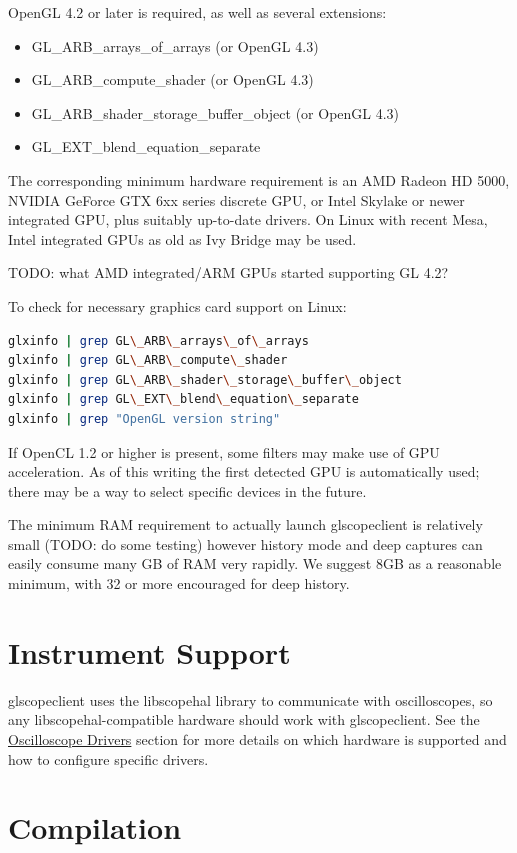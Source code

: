 OpenGL 4.2 or later is required, as well as several extensions:
\begin{itemize}
\item GL\_ARB\_arrays\_of\_arrays (or OpenGL 4.3)
\item GL\_ARB\_compute\_shader (or OpenGL 4.3)
\item GL\_ARB\_shader\_storage\_buffer\_object (or OpenGL 4.3)
\item GL\_EXT\_blend\_equation\_separate
\end{itemize}

The corresponding minimum hardware requirement is an AMD Radeon HD 5000, NVIDIA GeForce GTX 6xx series discrete GPU, or
Intel Skylake or newer integrated GPU, plus suitably up-to-date drivers. On Linux with recent Mesa, Intel integrated
GPUs as old as Ivy Bridge may be used.

TODO: what AMD integrated/ARM GPUs started supporting GL 4.2?

To check for necessary graphics card support on Linux:
\begin{lstlisting}[language=sh]
glxinfo | grep GL\_ARB\_arrays\_of\_arrays
glxinfo | grep GL\_ARB\_compute\_shader
glxinfo | grep GL\_ARB\_shader\_storage\_buffer\_object
glxinfo | grep GL\_EXT\_blend\_equation\_separate
glxinfo | grep "OpenGL version string"
\end{lstlisting}

If OpenCL 1.2 or higher is present, some filters may make use of GPU acceleration. As of this writing the first
detected GPU is automatically used; there may be a way to select specific devices in the future.

The minimum RAM requirement to actually launch glscopeclient is relatively small (TODO: do some testing) however
history mode and deep captures can easily consume many GB of RAM very rapidly. We suggest 8GB as a reasonable minimum,
with 32 or more encouraged for deep history.

\section{Instrument Support}

glscopeclient uses the libscopehal library to communicate with oscilloscopes, so any libscopehal-compatible hardware
should work with glscopeclient. See the \hyperref[sec:drivers]{Oscilloscope Drivers} section for more details on which
hardware is supported and how to configure specific drivers.

\section{Compilation}

